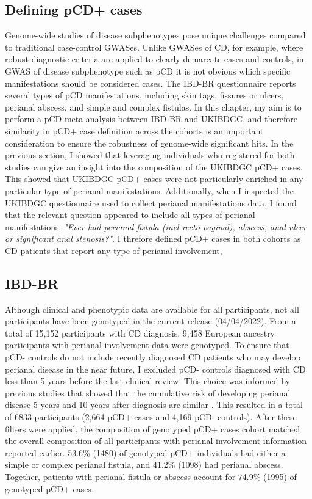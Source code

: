   \subsection{Defining pCD+ cases}
  Genome-wide studies of disease subphenotypes pose unique challenges compared to traditional case-control GWASes. Unlike GWASes of CD, for example, where robust diagnostic criteria are applied to clearly demarcate cases and controls, in GWAS of disease subphenotype such as pCD it is not obvious which specific manifestations should be considered cases. The IBD-BR questionnaire reports several types of pCD manifestations, including skin tags, fissures or ulcers, perianal abscess, and simple and complex fistulas. In this chapter, my aim is to perform a pCD meta-analysis between IBD-BR and UKIBDGC, and therefore similarity in pCD+ case definition across the cohorts is an important consideration to ensure the robustness of genome-wide significant hits. In the previous section, I showed that leveraging individuals who registered for both studies can give an insight into the composition of the UKIBDGC pCD+ cases. This showed that UKIBDGC pCD+ cases were not particularly enriched in any particular type of perianal manifestations. Additionally, when I inspected the UKIBDGC questionnaire used to collect perianal manifestations data, I found that the relevant question appeared to include all types of perianal manifestations: \textit{"Ever had perianal fistula (incl recto-vaginal),  abscess, anal ulcer or significant anal stenosis?"}. I threfore defined pCD+ cases in both cohorts as CD patients that report any type of perianal involvement,
  
 
\subsection{IBD-BR}
Although clinical and phenotypic data are available for all participants, not all participants have been genotyped in the current release (04/04/2022). From a total of 15,152 participants with CD diagnosis, 9,458 European ancestry participants with perianal involvement data were genotyped. To ensure that pCD- controls do not include recently diagnosed CD patients who may develop perianal disease in the near future, I excluded pCD- controls diagnosed with CD less than 5 years before the last clinical review. This choice was informed by previous studies that showed that the cumulative risk of developing perianal disease 5 years and 10 years after diagnosis are similar \cite{Tsai2022-kz}. This resulted in a total of 6833 participants (2,664 pCD+ cases and 4,169 pCD- controls). After these filters were applied, the composition of genotyped pCD+ cases cohort matched the overall composition of all participants with perianal involvement information reported earlier. 53.6\% (1480) of genotyped pCD+ individuals had either a simple or complex perianal fistula, and 41.2\% (1098) had perianal abscess. Together, patients with perianal fistula or abscess account for 74.9\% (1995) of genotyped pCD+ cases.\\

